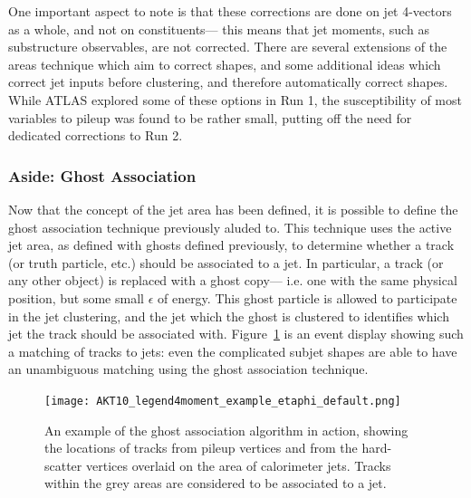 One important aspect to note is that these corrections are done on jet 4-vectors as a whole, and not on constituents--- this means that jet moments, such as substructure observables, are not corrected. There are several extensions of the areas technique which aim to correct shapes, and some additional ideas which correct jet inputs before clustering, and therefore automatically correct shapes. While ATLAS explored some of these options in Run 1, the susceptibility of most variables to pileup was found to be rather small, putting off the need for dedicated corrections to Run 2. 



\subsubsection{Aside: Ghost Association}
\label{jet-reconstruction:pileup:ghost-association}

Now that the concept of the jet area has been defined, it is possible to define the ghost association technique previously aluded to. This technique uses the active jet area, as defined with ghosts defined previously, to determine whether a track (or truth particle, etc.) should be associated to a jet. In particular, a track (or any other object) is replaced with a ghost copy--- i.e. one with the same physical position, but some small $\epsilon$ of energy. This ghost particle is allowed to participate in the jet clustering, and the jet which the ghost is clustered to identifies which jet the track should be associated with. Figure~\ref{fig:jet-reconstruction:ghost} is an event display showing such a matching of tracks to jets: even the complicated subjet shapes are able to have an unambiguous matching using the ghost association technique.



\begin{figure}
\centering
\texttt{[image: AKT10\_legend4moment\_example\_etaphi\_default.png]}
\label{fig:jet-reconstruction:ghost}
\caption{An example of the ghost association algorithm in action, showing the locations of tracks from pileup vertices and from the hard-scatter vertices overlaid on the area of calorimeter jets. Tracks within the grey areas are considered to be associated to a jet.}
\end{figure}




